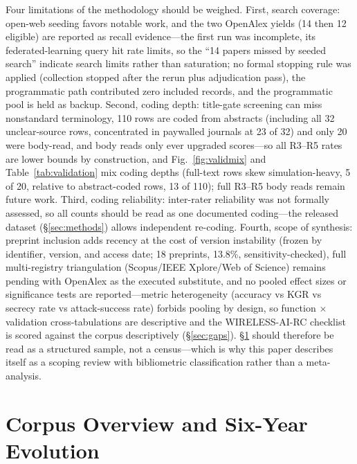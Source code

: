 Four limitations of the methodology should be weighed. First, search coverage: open-web seeding favors notable work, and the two OpenAlex yields (14 then 12 eligible) are reported as recall evidence---the first run was incomplete, its federated-learning query hit rate limits, so the ``14 papers missed by seeded search'' indicate search limits rather than saturation; no formal stopping rule was applied (collection stopped after the rerun plus adjudication pass), the programmatic path contributed zero included records, and the programmatic pool is held as backup. Second, coding depth: title-gate screening can miss nonstandard terminology, 110 rows are coded from abstracts (including all 32 unclear-source rows, concentrated in paywalled journals at 23 of 32) and only 20 were body-read, and body reads only ever upgraded scores---so all R3--R5 rates are lower bounds by construction, and Fig.~\ref{fig:validmix} and Table~\ref{tab:validation} mix coding depths (full-text rows skew simulation-heavy, 5 of 20, relative to abstract-coded rows, 13 of 110); full R3--R5 body reads remain future work. Third, coding reliability: inter-rater reliability was not formally assessed, so all counts should be read as one documented coding---the released dataset (\S\ref{sec:methods}) allows independent re-coding. Fourth, scope of synthesis: preprint inclusion adds recency at the cost of version instability (frozen by identifier, version, and access date; 18 preprints, 13.8\%, sensitivity-checked), full multi-registry triangulation (Scopus/IEEE Xplore/Web of Science) remains pending with OpenAlex as the executed substitute, and no pooled effect sizes or significance tests are reported---metric heterogeneity (accuracy vs KGR vs secrecy rate vs attack-success rate) forbids pooling by design, so function $\times$ validation cross-tabulations are descriptive and the WIRELESS-AI-RC checklist is scored against the corpus descriptively (\S\ref{sec:gaps}). \S\ref{sec:corpus} should therefore be read as a structured sample, not a census---which is why this paper describes itself as a scoping review with bibliometric classification rather than a meta-analysis.

\section{Corpus Overview and Six-Year Evolution}
\label{sec:corpus}
